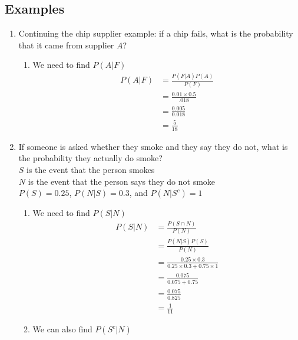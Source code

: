 \documentclass[12pt]{article}
\begin{document}
        \subsection{Examples}
            \begin{enumerate}
                \item Continuing the chip supplier example: if a chip fails, what is the probability that it came from supplier $A$?
                \begin{enumerate}
                    \item We need to find $P(A|F)$
                    \begin{align*}
                        P(A|F) &= \frac{P(F|A)P(A)}{P(F)}\\
                        &= \frac{0.01\times0.5}{.018}\\
                        &= \frac{0.005}{0.018}\\
                        &= \frac{5}{18}
                    \end{align*}
                \end{enumerate}
                \item If someone is asked whether they smoke and they say they do not, what is the probability they actually do smoke?
                \\$S$ is the event that the person smokes
                \\$N$ is the event that the person says they do not smoke
                \\$P(S) = 0.25$, $P(N|S) = 0.3$, and $P(N|S^c) = 1$
                \begin{enumerate}
                    \item We need to find $P(S|N)$
                    \begin{align*}
                        P(S|N) &= \frac{P(S \cap N)}{P(N)}\\
                        &= \frac{P(N|S)P(S)}{P(N)}\\
                        &= \frac{0.25\times0.3}{0.25\times0.3+0.75\times1}\\
                        &= \frac{0.075}{0.075+0.75}\\
                        &= \frac{0.075}{0.825}\\
                        &= \frac{1}{11}
                    \end{align*}
                    \item We can also find $P(S^c|N)$
                    \begin{align*}

\end{align*}
\end{enumerate}
\end{enumerate}
\end{document}
